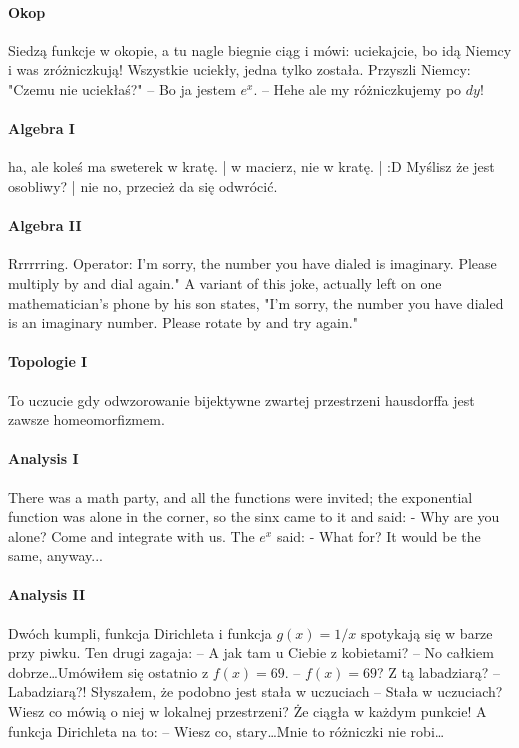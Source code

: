 \begin{parnumbers}
\paragraph{Okop} Siedzą funkcje w okopie, a tu nagle biegnie ciąg i mówi: uciekajcie, bo idą Niemcy i was zróżniczkują! Wszystkie uciekły, jedna tylko została. Przyszli Niemcy: "Czemu nie uciekłaś?" \newline-- Bo ja jestem $e^x$. \newline-- Hehe ale my różniczkujemy po $dy$!
\paragraph{Algebra I} ha, ale koleś ma sweterek w kratę. | w macierz, nie w kratę. | :D Myślisz że jest osobliwy? | nie no, przecież da się odwrócić.
\paragraph{Algebra II} Rrrrrring. Operator: I'm sorry, the number you have dialed is imaginary. Please multiply by  and dial again." A variant of this joke, actually left on one mathematician's phone by his son states, "I'm sorry, the number you have dialed is an imaginary number. Please rotate by  and try again."
\paragraph{Topologie I} To uczucie gdy odwzorowanie bijektywne zwartej przestrzeni hausdorffa jest zawsze homeomorfizmem.
\paragraph{Analysis I} There was a math party, and all the functions were invited; the exponential function was alone in the corner, so the sinx came to it and said: - Why are you alone? Come and integrate with us. The $e^x$ said: - What for? It would be the same, anyway...
\paragraph{Analysis II} Dwóch kumpli, funkcja Dirichleta i funkcja $g(x)=1/x$ spotykają się w barze przy piwku. Ten drugi zagaja: \newline-- A jak tam u Ciebie z kobietami? \newline-- No całkiem dobrze\dots Umówiłem się ostatnio z $f(x)=69$. \newline-- $f(x)=69$? Z tą labadziarą? \newline-- Labadziarą?! Słyszałem, że podobno jest stała w uczuciach \newline-- Stała w uczuciach? Wiesz co mówią o niej w lokalnej przestrzeni? Że ciągła w każdym punkcie! \newline A funkcja Dirichleta na to: \newline-- Wiesz co, stary\dots Mnie to różniczki nie robi…

\end{parnumbers}
